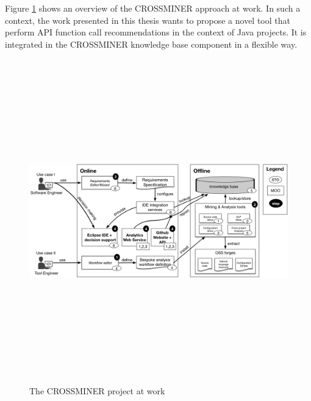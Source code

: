 Figure \ref{fig:crossminerApproach} shows an overview of the 
CROSSMINER 
approach at work. In such a context, the work presented in 
this thesis wants to 
propose a novel tool that perform API function call 
recommendations in the 
context of Java projects. It is integrated in the CROSSMINER 
knowledge base 
component in a  flexible way. 



\begin{figure}[!t]
\includegraphics[width=14cm,height=14cm,keepaspectratio]{images/crossminer.png}
\centering
\caption{The CROSSMINER project at work}
\label{fig:crossminerApproach}
\end{figure}


